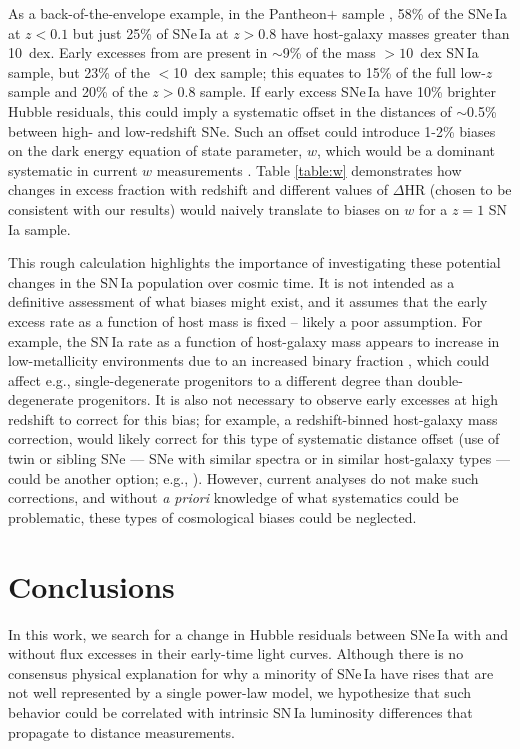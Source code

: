 \documentclass[twocolumn,twocolappendix, linenumbers]{aastex631} %
\begin{document}
As a back-of-the-envelope example, in the Pantheon$+$ sample \citep{Scolnic22}, 58\% of the SNe\,Ia at $z < 0.1$ but just 25\% of SNe\,Ia at $z > 0.8$ have host-galaxy masses greater than 10~dex.  Early excesses from \citet{Yao19} are present in $\sim$9\% of the mass $>10$~dex SN\,Ia sample, but 23\% of the $<$10~dex sample; this equates to 15\% of the full low-$z$ sample and 20\% of the $z > 0.8$ sample.  If early excess SNe\,Ia have 10\% brighter Hubble residuals, this could imply a systematic offset in the distances of $\sim$0.5\% between high- and low-redshift SNe.
Such an offset could introduce 1-2\% biases on the dark energy equation of state parameter, $w$, which would be a dominant systematic in current $w$ measurements \citep{Brout22}.  Table \ref{table:w} demonstrates how changes in excess fraction with redshift and different values of $\Delta$HR (chosen to be consistent with our results) would naively translate to biases on $w$ for a $z = 1$ SN\,Ia sample.

This rough calculation highlights the importance of investigating these potential changes in the SN\,Ia population over cosmic time.  It is not intended as a definitive assessment of what biases might exist, and it assumes that the early excess rate as a function of host mass is fixed -- likely a poor assumption.  For example, the SN\,Ia rate as a function of host-galaxy mass \citep{Brown19,Wiseman21} appears to increase in low-metallicity environments due to an increased binary fraction \citep{Gandhi22,Johnson23}, which could affect e.g., single-degenerate progenitors to a different degree than double-degenerate progenitors.
It is also not necessary to observe early excesses at high redshift to correct for this bias; for example, a redshift-binned host-galaxy mass correction, would likely correct for this type of systematic distance offset (use of twin or sibling SNe --- SNe with similar spectra or in similar host-galaxy types --- could be another option; e.g., \citealp{Fakhouri15,Hoogendam23}).  However, current analyses do not make such corrections, and without {\it a priori} knowledge of what systematics could be problematic, these types of cosmological biases could be neglected.



\section{Conclusions}
In this work, we search for a change in Hubble residuals between SNe\,Ia with and without flux excesses in their early-time light curves.  Although there is no consensus physical explanation for why a minority of SNe\,Ia have rises that are not well represented by a single power-law model, we hypothesize that such behavior could be correlated with intrinsic SN\,Ia luminosity differences that propagate to distance measurements.
\end{document}
